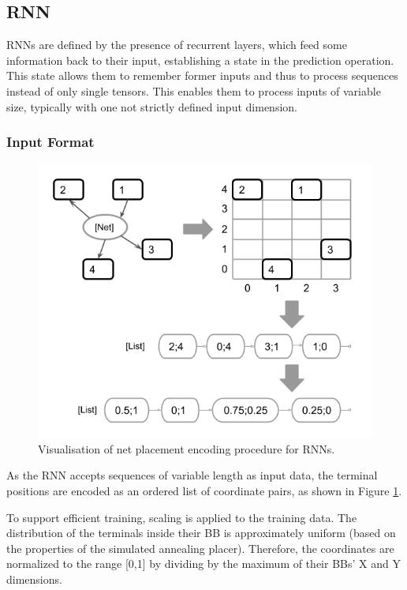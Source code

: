 \pagebreak

\subsection{\gls{RNN}}

\glspl{RNN} are defined by the presence of recurrent layers, which feed some information back to their input, establishing a state in the prediction operation. This state allows them to remember former inputs and thus to process sequences instead of only single tensors. This enables them to process inputs of variable size, typically with one not strictly defined input dimension.

\subsubsection{Input Format}

\begin{figure}
	\includegraphics[width=\linewidth]{plots/rnn-encoding-proper.png}
	\caption{Visualisation of net placement encoding procedure for \glspl{RNN}.}
	\label{fig:rnn-encoding}
\end{figure}

As the \gls{RNN} accepts sequences of variable length as input data, the terminal positions are encoded as an ordered list of coordinate pairs, as shown in Figure \ref{fig:rnn-encoding}.

To support efficient training, scaling is applied to the training data. The distribution of the terminals inside their \gls{BB} is approximately uniform (based on the properties of the simulated annealing placer). Therefore, the coordinates are normalized to the range [0,1] by dividing by the maximum of their \glspl{BB}' X and Y dimensions. 

